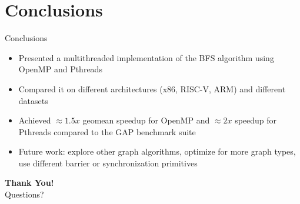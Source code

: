 \section{Conclusions}
\begin{frame}{Conclusions}
\begin{itemize}
  \item Presented a multithreaded implementation of the BFS algorithm using OpenMP and Pthreads
  \item Compared it on different architectures (x86, RISC-V, ARM) and different datasets
  \item Achieved $\approx 1.5x$ geomean speedup for OpenMP and $\approx 2x$ speedup for Pthreads compared to the GAP benchmark suite
  \item Future work: explore other graph algorithms, optimize for more graph types, use different barrier or synchronization primitives
\end{itemize}
\end{frame}

\begin{frame}[plain]
  \advance\textwidth2cm
  \hsize\textwidth
  \columnwidth\textwidth
  \centering
  \Huge \textbf{\alert{Thank You!}} \\[1em]
  \Large Questions?
\end{frame}